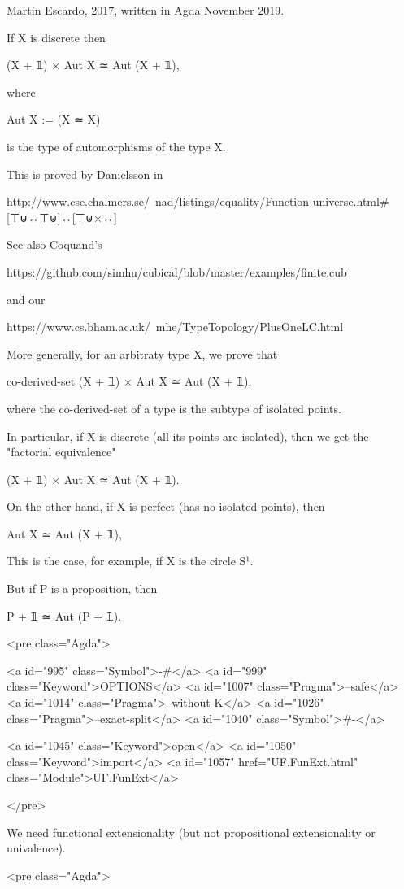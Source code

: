 Martin Escardo, 2017, written in Agda November 2019.

If X is discrete then

  (X + 𝟙) × Aut X ≃ Aut (X + 𝟙),

where

  Aut X := (X ≃ X)

is the type of automorphisms of the type X.

This is proved by Danielsson in

 http://www.cse.chalmers.se/~nad/listings/equality/Function-universe.html#[⊤⊎↔⊤⊎]↔[⊤⊎×↔]

See also Coquand's

 https://github.com/simhu/cubical/blob/master/examples/finite.cub

and our

 https://www.cs.bham.ac.uk/~mhe/TypeTopology/PlusOneLC.html

More generally, for an arbitraty type X, we prove that

  co-derived-set (X + 𝟙) × Aut X ≃ Aut (X + 𝟙),

where the co-derived-set of a type is the subtype of isolated points.

In particular, if X is discrete (all its points are isolated), then we
get the "factorial equivalence"

  (X + 𝟙) × Aut X ≃ Aut (X + 𝟙).

On the other hand, if X is perfect (has no isolated points), then

  Aut X ≃ Aut (X + 𝟙),

This is the case, for example, if X is the circle S¹.

But if P is a proposition, then

  P + 𝟙 ≃ Aut (P + 𝟙).

<pre class="Agda">

<a id="995" class="Symbol">{-#</a> <a id="999" class="Keyword">OPTIONS</a> <a id="1007" class="Pragma">--safe</a> <a id="1014" class="Pragma">--without-K</a> <a id="1026" class="Pragma">--exact-split</a> <a id="1040" class="Symbol">#-}</a>

<a id="1045" class="Keyword">open</a> <a id="1050" class="Keyword">import</a> <a id="1057" href="UF.FunExt.html" class="Module">UF.FunExt</a>

</pre>

We need functional extensionality (but not propositional
extensionality or univalence).

<pre class="Agda">

